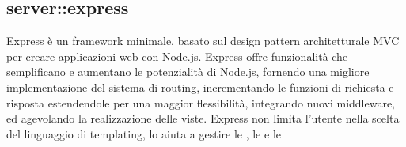 \vspace{0.5cm}
\subsection{server::express}
Express è un framework minimale, basato sul design pattern architetturale MVC per creare applicazioni web con Node.js. Express offre funzionalità che semplificano e aumentano le potenzialità di Node.js, fornendo una migliore implementazione del sistema di routing, incrementando
le funzioni di richiesta e risposta estendendole per una maggior flessibilità, integrando nuovi middleware, ed agevolando la realizzazione delle viste.
Express non limita l’utente nella scelta del linguaggio di templating, lo aiuta a gestire le , le  e le \begin{center}
	\begin{figure}[H]

\end{figure}
\end{center}
